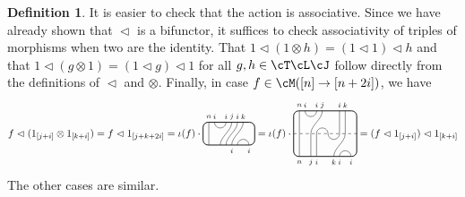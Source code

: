 \documentclass[11pt]{article}
\theoremstyle{plain}
\theoremstyle{definition}
\newtheorem{defn}[thm]{Definition}
\newcommand{\TLJ}{\cT\cL\cJ}
\begin{document}
\begin{defn}
 It is easier to check that the action is associative.
Since we have already shown that $\vartriangleleft$ is a bifunctor, it suffices to check associativity of triples of morphisms when two are the identity. 
 That $1\vartriangleleft(1\otimes h)=(1\vartriangleleft1)\vartriangleleft h$ and that $1\vartriangleleft(g\otimes 1)=(1\vartriangleleft g)\vartriangleleft 1$ for all $g,h\in\TLJ$ follow directly from the definitions of $\vartriangleleft$ and $\otimes$. 
 Finally, in case $f\in\cM([n]\to[n+2i])$, we have 
  \[f\vartriangleleft(1_{[j+i]}\otimes1_{[k+i]}) = f\vartriangleleft 1_{[j+k+2i]}
  = \iota(f)\cdot
  \begin{tikzpicture}[baseline=.3cm]
   \draw (.2,0) -- (.2,.8);
   \node at (.2,1) {\scriptsize{$n$}};
   \draw (.4,.8) arc (-180:0:.2cm);
   \node at (.4,1) {\scriptsize{$i$}};
   \node at (.8,1) {\scriptsize{$i$}};
   \draw (.6,0) .. controls ++(90:.3cm) and ++(270:.3cm) .. (1,.8);
   \node at (1,1) {\scriptsize{$j$}};
   \draw (.8,0) .. controls ++(90:.3cm) and ++(270:.3cm) .. (1.2,.8);
   \node at (1.2,1) {\scriptsize{$i$}};
   \draw (1,0) .. controls ++(90:.3cm) and ++(270:.3cm) .. (1.4,.8);
   \node at (1.4,1) {\scriptsize{$k$}};
   \draw (1.2,0) arc (180:0:.2cm);
   \node at (1,-.2) {\scriptsize{$i$}};
   \node at (1.6,-.2) {\scriptsize{$i$}};
   \draw[thick, rounded corners=5pt] (0,0) rectangle (1.8,.8);
  \end{tikzpicture}
  = \iota(f)\cdot
  \begin{tikzpicture}[baseline=.3cm]
   \begin{scope}[shift={(0,.4)}]
    \draw (.2,0) -- (.2,.8);
    \node at (.2,1) {\scriptsize{$n$}};
    \draw (.4,.8) arc (-180:0:.2cm);
    \node at (.4,1) {\scriptsize{$i$}};
    \node at (.8,1) {\scriptsize{$i$}};
    \draw (.6,0) .. controls ++(90:.3cm) and ++(270:.3cm) .. (1,.8);
    \node at (1,1) {\scriptsize{$j$}};
    \draw (.8,0) arc (180:0:.2cm); %
    \draw (1.6,0) -- (1.6,.8);
    \node at (1.6,1) {\scriptsize{$i$}};
    \draw (1.8,0) -- (1.8,.8);
    \node at (1.8,1) {\scriptsize{$k$}};
    \draw[dashed] (0,0) -- (2.2,0);
   \end{scope}
   \begin{scope}[shift={(0,-.4)}]
    \draw (.2,0) -- (.2,.8);
    \node at (.2,-.2) {\scriptsize{$n$}};
    \draw (.6,0) -- (.6,.8);
    \node at (.6,-.2) {\scriptsize{$j$}};
    \draw (.8,0) -- (.8,.8);
    \node at (.8,-.2) {\scriptsize{$i$}};
    \draw (1.2,.8) arc (-180:0:.2cm); %
    \draw (1.4,0) .. controls ++(90:.3cm) and ++(270:.3cm) .. (1.8,.8);
    \node at (1.4,-.2) {\scriptsize{$k$}};
    \draw (1.6,0) arc (180:0:.2cm);
    \node at (1.6,-.2) {\scriptsize{$i$}};
    \node at (2,-.2) {\scriptsize{$i$}};
   \end{scope}
   \draw[thick, rounded corners=5pt] (0,-.4) rectangle (2.2,1.2);
  \end{tikzpicture}
  = (f\vartriangleleft1_{[j+i]})\vartriangleleft1_{[k+i]}\]
 The other cases are similar.
\end{defn}
\end{document}
